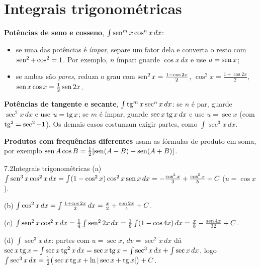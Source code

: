 
\section{Integrais trigonométricas}

\textbf{Potências de seno e cosseno}, $\int\operatorname{sen}^mx\cos^nx\,dx$:
\begin{itemize}
\item se uma das potências é \emph{ímpar}, separe um fator dela e converta o resto com
  $\operatorname{sen}^2+\cos^2=1$. Por exemplo, $n$ ímpar: guarde $\cos x\,dx$ e use $u=\operatorname{sen} x$;
\item se ambas são \emph{pares}, reduza o grau com
  $\operatorname{sen}^2x=\frac{1-\cos2x}2$, $\cos^2x=\frac{1+\cos2x}2$, $\operatorname{sen} x\cos x=\frac12\operatorname{sen}2x$.
\end{itemize}

\textbf{Potências de tangente e secante}, $\int\operatorname{tg}^mx\sec^nx\,dx$: se $n$ é par, guarde
$\sec^2x\,dx$ e use $u=\operatorname{tg} x$; se $m$ é ímpar, guarde $\sec x\operatorname{tg} x\,dx$ e use $u=\sec x$
(com $\operatorname{tg}^2=\sec^2-1$). Os demais casos costumam exigir partes, como $\int\sec^3x\,dx$.

\textbf{Produtos com frequências diferentes} usam as fórmulas de produto em soma, por exemplo
$\operatorname{sen} A\cos B=\frac12[\operatorname{sen}(A-B)+\operatorname{sen}(A+B)]$.

\begin{exemplo}{7.2}{Integrais trigonométricas}
(a) $\int\operatorname{sen}^3x\cos^2x\,dx=\int(1-\cos^2x)\cos^2x\operatorname{sen} x\,dx
=-\frac{\cos^3x}3+\frac{\cos^5x}5+C$ \quad ($u=\cos x$).

(b) $\int\cos^2x\,dx=\int\frac{1+\cos2x}2\,dx=\frac x2+\frac{\operatorname{sen}2x}4+C$.

(c) $\int\operatorname{sen}^2x\cos^2x\,dx=\frac14\int\operatorname{sen}^22x\,dx=\frac18\int(1-\cos4x)\,dx
=\frac x8-\frac{\operatorname{sen}4x}{32}+C$.

(d) $\int\sec^3x\,dx$: partes com $u=\sec x$, $dv=\sec^2x\,dx$ dá
$\sec x\operatorname{tg} x-\int\sec x\operatorname{tg}^2x\,dx=\sec x\operatorname{tg} x-\int\sec^3x\,dx+\int\sec x\,dx$, logo
$\int\sec^3x\,dx=\frac12\big(\sec x\operatorname{tg} x+\ln|\sec x+\operatorname{tg} x|\big)+C$.
\end{exemplo}

